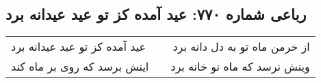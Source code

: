 \begin{center}
\section*{رباعی شماره ۷۷۰: عید آمده کز تو عید عیدانه برد}
\label{sec:0770}
\begin{longtable}{l p{0.5cm} r}
عید آمده کز تو عید عیدانه برد
&&
از خرمن ماه تو به دل دانه برد
\\
اینش برسد که روی بر ماه کند
&&
وینش نرسد که ماه نو خانه برد
\\
\end{longtable}
\end{center}
